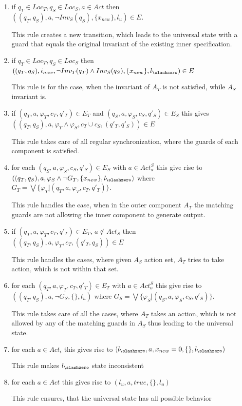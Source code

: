 \begin{enumerate}
	\item if $q_T\in Loc_T, q_S\in Loc_S, a\in Act$ then $((q_T,q_S), a, \neg Inv_S(q_S), \{x_{new}\}, l_u)\in E$.
		
	This rule creates a new transition, which leads to the universal state with a guard that equals the original invariant of the existing inner specification.
	\item if $q_T\in Loc_T, q_S\in Loc_S$ then $((q_T,q_S),i_{new}, \neg Inv_T(q_T) \land Inv_S(q_S), \{x_{new}\}, l_{\slashzero})\in E$
		
	This rule is for the case, when the invariant of $A_T$ is not satisfied, while $A_S$ invariant is.
	\item if $(q_T, a, \varphi_T, c_T, q'_T)\in E_T$ and $(q_S, a, \varphi_S, c_S, q'_S)\in E_S$ this gives $((q_T,q_S), a, \varphi_T \land \varphi_S, c_T \cup c_S, (q'_T,q'_S))\in E$
		
	This rule takes care of all regular synchronization, where the guards of each component is satisfied.
	\item for each $(q_S, a, \varphi_S, c_S, q'_S)\in E_S$ with $a \in Act_o^S$ this give rise to $((q_T,q_S), a, \varphi_S \land \neg G_T, \{x_{new}\}, l_{\slashzero})$ where $G_T = \bigvee \{\varphi_T |(q_T, a, \varphi_T, c_T, q'_T)\}$.
		
	This rule handles the case, when in the outer component $A_T$ the matching guards are not allowing the inner component to generate output.
	\item if $(q_T, a, \varphi_T, c_T, q'_T)\in E_T$, $a\notin Act_S$ then $((q_T,q_S), a, \varphi_T, c_T, (q'_T,q_S))\in E$
		
	This rule handles the cases, where given $A_S$ action set, $A_T$ tries to take action, which is not within that set.
	\item for each $(q_T, a, \varphi_T, c_T, q'_T)\in E_T$ with $a \in Act_o^S$ this give rise to $((q_T,q_S), a, \neg G_S, \{\}, l_u)$ where $G_S = \bigvee \{\varphi_S |(q_S, a, \varphi_S, c_S, q'_S)\}$. 
		
	This rule takes care of all the cases, where $A_T$ takes an action, which is not allowed by any of the matching guards in $A_S$ thus leading to the universal state. 
	\item for each $a \in Act_i$ this gives rise to $(l_{\slashzero}, a, x_{new} = 0,\{\}, l_{\slashzero})$
		
	This rule makes $l_{\slashzero}$ state inconsistent
	\item for each $a \in Act$ this gives rise to $(l_u, a, true,\{\}, l_u)$
		
	This rule ensures, that the universal state has all possible behavior
\end{enumerate}

